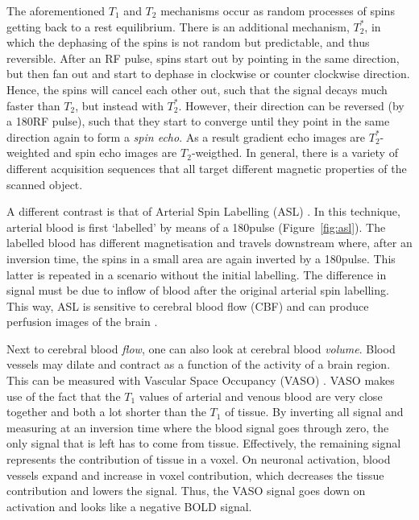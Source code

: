 The aforementioned $T_1$ and $T_2$ mechanisms occur as random processes of spins getting back to a rest equilibrium. There is an additional mechanism, $T_2^*$, in which the dephasing of the spins is not random but predictable, and thus reversible. After an RF pulse, spins start out by pointing in the same direction, but then fan out and start to dephase in clockwise or counter clockwise direction. Hence, the spins will cancel each other out, such that the signal decays much faster than $T_2$, but instead with $T_2^*$. However, their direction can be reversed (by a 180\textdegree RF pulse), such that they start to converge until they point in the same direction again to form a \emph{spin echo}. As a result gradient echo images are $T_2^*$-weighted and spin echo images are $T_2$-weigthed. In general, there is a variety of different acquisition sequences that all target different magnetic properties of the scanned object.

A different contrast is that of Arterial Spin Labelling (ASL) \cite{Williams1992,Detre1994}. In this technique, arterial blood is first `labelled' by means of a 180\textdegree pulse (Figure~\ref{fig:asl}). The labelled blood has different magnetisation and travels downstream where, after an inversion time, the spins in a small area are again inverted by a 180\textdegree pulse. This latter is repeated in a scenario without the initial labelling. The difference in signal must be due to inflow of blood after the original arterial spin labelling. This way, ASL is sensitive to cerebral blood flow (CBF) and can produce perfusion images of the brain \cite{Petcharunpaisan2010}.


Next to cerebral blood \emph{flow}, one can also look at cerebral blood \emph{volume}. Blood vessels may dilate and contract as a function of the activity of a brain region. This can be measured with Vascular Space Occupancy (VASO) \cite{Lu2003}. VASO makes use of the fact that the $T_1$ values of arterial and venous blood are very close together and both a lot shorter than the $T_1$ of tissue. By inverting all signal and measuring at an inversion time where the blood signal goes through zero, the only signal that is left has to come from tissue. Effectively, the remaining signal represents the contribution of tissue in a voxel. On neuronal activation, blood vessels expand and increase in voxel contribution, which decreases the tissue contribution and lowers the signal. Thus, the VASO signal goes down on activation and looks like a negative BOLD signal.

